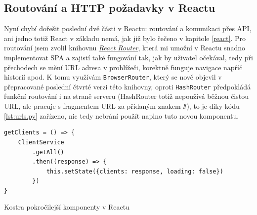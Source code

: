     \subsection{Routování a HTTP požadavky v Reactu}
    Nyní chybí dořešit poslední dvě části v Reactu: routování a komunikaci přes API, ani jedno totiž React v základu nemá, jak již bylo řečeno v kapitole \ref{react}. Pro routování jsem zvolil knihovnu \href{https://reacttraining.com/}{\textit{React Router}}, která mi umožní v Reactu snadno implementovat SPA a zajistí také fungování tak, jak by uživatel očekával, tedy při přechodech se mění URL adresa v prohlížeči, korektně funguje navigace napříč historií apod. K tomu využívám \verb|BrowserRouter|, který se nově objevil v přepracované poslední čtvrté verzi této knihovny, oproti \verb|HashRouter| předpokládá funkční routování i na straně serveru (HashRouter totiž nepoužívá běžnou čistou URL, ale pracuje s fragmentem URL za přidaným znakem \verb|#|), to je díky kódu \ref{lst:urls.py} zařízeno, nic tedy nebrání použít naplno tuto novou komponentu.
    
    \begin{listing}[ht]
    	\begin{verbatim}
getClients = () => {
    ClientService
        .getAll()
        .then((response) => {
            this.setState({clients: response, loading: false})
        })
}
    	\end{verbatim}
    	\caption{Kostra pokročilejší komponenty v Reactu}\label{lst:react3}
    \end{listing}
    
